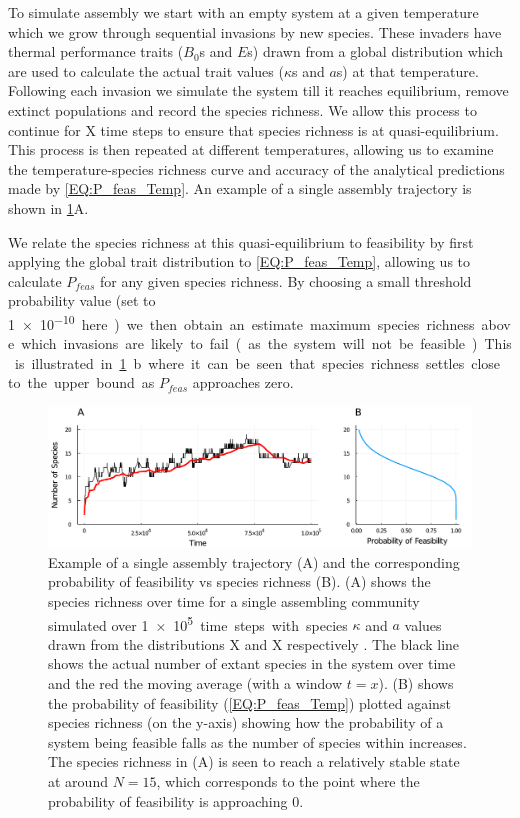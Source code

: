 \documentclass{article}
\begin{document}
To simulate assembly we start with an empty system at a given temperature which we grow through sequential invasions by new species. These invaders have thermal performance traits ($B_0$s and $E$s) drawn from a global distribution which are used to calculate the actual trait values ($\kappa$s and $a$s) at that temperature. Following each invasion we simulate the system till it reaches equilibrium, remove extinct populations and record the species richness. We allow this process to continue for X time steps to ensure that species richness  is at quasi-equilibrium. This process is then repeated at different temperatures, allowing us to examine the temperature-species richness curve and accuracy of the analytical predictions made by \cref{EQ:P_feas_Temp}. An example of a single assembly trajectory is shown in \cref{Fig:Assembly_Example}A.  

We relate the species richness at this quasi-equilibrium to feasibility by first applying the global trait distribution to \cref{EQ:P_feas_Temp}, allowing us to calculate $P_{feas}$ for any given species richness. By choosing a small threshold probability value (set to \SI{1e-10} here) we then obtain an estimate maximum species richness above which invasions are likely to fail (as the system will not be feasible). This is illustrated in \cref{Fig:Assembly_Example}b where it can be seen that species richness settles close to the upper bound as $P_{feas}$ approaches zero.  

\begin{figure}[h]
    \centering
    \includegraphics[width = \textwidth]{docs/Figures/Fig_3.pdf}
    \caption{Example of a single assembly trajectory (A) and the corresponding probability of feasibility vs species richness (B). (A) shows the species richness over time for a single assembling community simulated over \SI{1e5} time steps with species $\kappa$ and $a$ values drawn from the distributions X and X respectively . The black line shows the actual number of extant species in the system over time and the red the moving average (with a window $t = x$). (B) shows the probability of feasibility (\cref{EQ:P_feas_Temp}) plotted against species richness (on the y-axis) showing how the probability of a system being feasible falls as the number of species within increases. The species richness in (A) is seen to reach a relatively stable state at around $N = 15$, which corresponds to the point where the probability of feasibility is approaching $0$.   }
    \label{Fig:Assembly_Example}
\end{figure}
\end{document}
